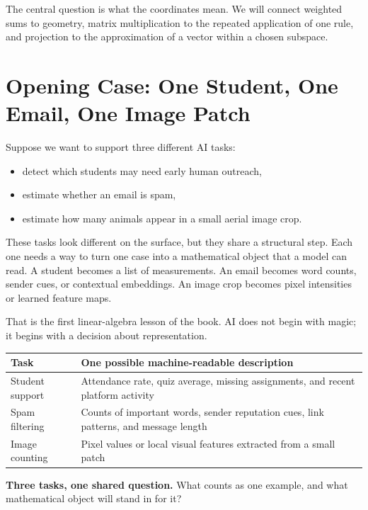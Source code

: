 The central question is what the coordinates mean. We will connect weighted sums to geometry, matrix multiplication to the repeated application of one rule, and projection to the approximation of a vector within a chosen subspace.

\section*{Opening Case: One Student, One Email, One Image Patch}

Suppose we want to support three different AI tasks:

\begin{itemize}[leftmargin=*]
\item detect which students may need early human outreach,
\item estimate whether an email is spam,
\item estimate how many animals appear in a small aerial image crop.
\end{itemize}

These tasks look different on the surface, but they share a structural step. Each one needs a way to turn one case into a mathematical object that a model can read. A student becomes a list of measurements. An email becomes word counts, sender cues, or contextual embeddings. An image crop becomes pixel intensities or learned feature maps.

That is the first linear-algebra lesson of the book. AI does not begin with magic; it begins with a decision about representation.

\begin{center}
\small
\begin{tabular}{p{2.33cm}p{7.62cm}}
\toprule
Task & One possible machine-readable description \\
\midrule
Student support & Attendance rate, quiz average, missing assignments, and recent platform activity \\
Spam filtering & Counts of important words, sender reputation cues, link patterns, and message length \\
Image counting & Pixel values or local visual features extracted from a small patch \\
\bottomrule
\end{tabular}

\medskip
\noindent\textbf{Three tasks, one shared question.} What counts as one example, and what mathematical object will stand in for it?
\end{center}

